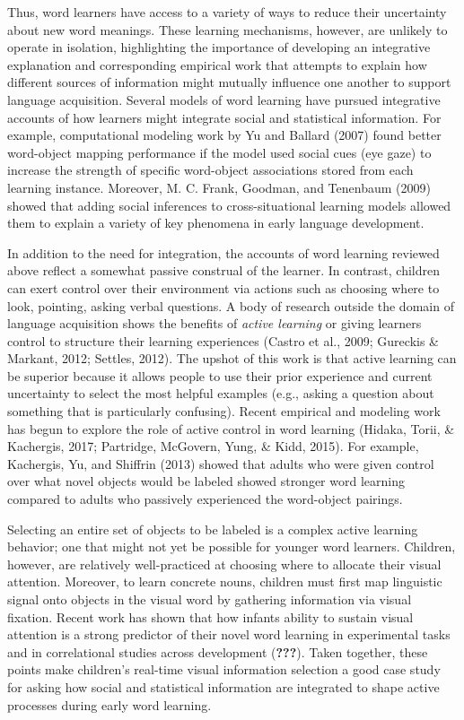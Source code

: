 \documentclass[man,floatsintext]{apa6}
\begin{document}
Thus, word learners have access to a variety of ways to reduce their
uncertainty about new word meanings. These learning mechanisms, however,
are unlikely to operate in isolation, highlighting the importance of
developing an integrative explanation and corresponding empirical work
that attempts to explain how different sources of information might
mutually influence one another to support language acquisition. Several
models of word learning have pursued integrative accounts of how
learners might integrate social and statistical information. For
example, computational modeling work by Yu and Ballard (2007) found
better word-object mapping performance if the model used social cues
(eye gaze) to increase the strength of specific word-object associations
stored from each learning instance. Moreover, M. C. Frank, Goodman, and
Tenenbaum (2009) showed that adding social inferences to
cross-situational learning models allowed them to explain a variety of
key phenomena in early language development.

In addition to the need for integration, the accounts of word learning
reviewed above reflect a somewhat passive construal of the learner. In
contrast, children can exert control over their environment via actions
such as choosing where to look, pointing, asking verbal questions. A
body of research outside the domain of language acquisition shows the
benefits of \emph{active learning} or giving learners control to
structure their learning experiences (Castro et al., 2009; Gureckis \&
Markant, 2012; Settles, 2012). The upshot of this work is that active
learning can be superior because it allows people to use their prior
experience and current uncertainty to select the most helpful examples
(e.g., asking a question about something that is particularly
confusing). Recent empirical and modeling work has begun to explore the
role of active control in word learning (Hidaka, Torii, \& Kachergis,
2017; Partridge, McGovern, Yung, \& Kidd, 2015). For example, Kachergis,
Yu, and Shiffrin (2013) showed that adults who were given control over
what novel objects would be labeled showed stronger word learning
compared to adults who passively experienced the word-object pairings.

Selecting an entire set of objects to be labeled is a complex active
learning behavior; one that might not yet be possible for younger word
learners. Children, however, are relatively well-practiced at choosing
where to allocate their visual attention. Moreover, to learn concrete
nouns, children must first map linguistic signal onto objects in the
visual word by gathering information via visual fixation. Recent work
has shown that how infants ability to sustain visual attention is a
strong predictor of their novel word learning in experimental tasks and
in correlational studies across development ({\textbf{???}}). Taken
together, these points make children's real-time visual information
selection a good case study for asking how social and statistical
information are integrated to shape active processes during early word
learning.
\end{document}
